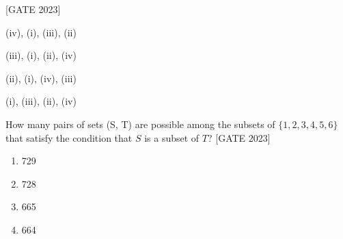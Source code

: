 \vspace{1em}


\hfill{[GATE 2023]}\begin{enumerate}
\begin{multicols}{2}
   \item (iv), (i), (iii), (ii)
   \item (iii), (i), (ii), (iv)
   \item (ii), (i), (iv), (iii)
   \item (i), (iii), (ii), (iv)
    \end{multicols}
\end{enumerate}
\item How many pairs of sets (S, T) are possible among the subsets of $ \{1, 2, 3, 4, 5, 6\} $ that satisfy the condition that $ S $ is a subset of $ T $?
\hfill{[GATE 2023]}
\begin{multicols}{2}
\begin{enumerate}
   \item 729
   \item 728
   \item 665
   \item 664
\end{enumerate}
\end{multicols}

